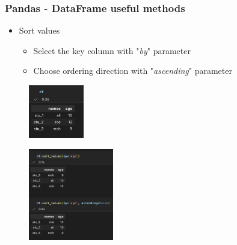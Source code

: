 \begin{frame}\frametitle{Pandas - DataFrame useful methods}
   \begin{minipage}{0.58\linewidth}
      \begin{itemize}
         \item Sort values
         \begin{itemize}
            \item Select the key column with "\textit{by}" parameter
            \item Choose ordering direction with "\textit{ascending}" parameter
         \end{itemize}
      \end{itemize}
      \vspace{.5cm}
      \begin{figure}[H]
         \includegraphics[width=2.4cm]{../images/illustrations/pandas_df_ex.png}
      \end{figure}
   \end{minipage}
   \begin{minipage}{0.38\linewidth}
      \begin{figure}[H]
         \includegraphics[width=3.7cm]{../images/illustrations/pandas_sort_values.png}
      \end{figure}
   \end{minipage}
\end{frame}


